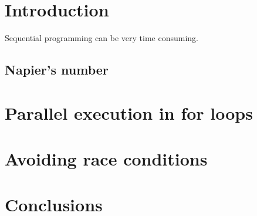 \documentclass[11pt,a4paper]{article}
\begin{document}
\newpage
\section{Introduction}
Sequential programming can be very time consuming.

\subsection{Napier's number}

\section{Parallel execution in for loops}

\section{Avoiding race conditions}

\section{Conclusions}
\end{document}
